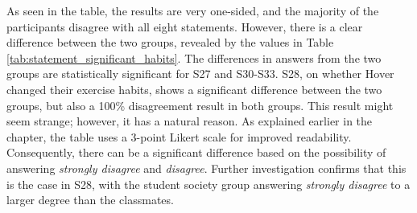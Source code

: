 As seen in the table, the results are very one-sided, and the majority of the participants disagree with all eight statements. However, there is a clear difference between the two groups, revealed by the values in Table \ref{tab:statement_significant_habits}. The differences in answers from the two groups are statistically significant for S27 and S30-S33. S28, on whether Hover changed their exercise habits, shows a significant difference between the two groups, but also a 100\% disagreement result in both groups. This result might seem strange; however, it has a natural reason. As explained earlier in the chapter, the table uses a 3-point Likert scale for improved readability. Consequently, there can be a significant difference based on the possibility of answering \textit{strongly disagree} and \textit{disagree}. Further investigation confirms that this is the case in S28, with the student society group answering \textit{strongly disagree} to a larger degree than the classmates.

